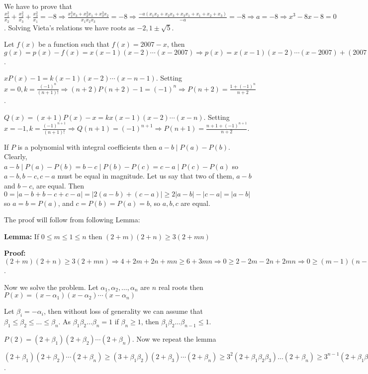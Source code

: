   We have to prove that $\frac{x_1^2}{x_2} + \frac{x_2^2}{x_3} + \frac{x_3^2}{x_1} = -8 \Rightarrow
  \frac{x_1^3x_3 + x_2^3x_1 + x_3^3x_2}{x_1x_2x_3} = -8 \Rightarrow \frac{-a(x_1x_2 + x_2x_3 + x_3x_1 + x_1
    + x_2 + x_3)}{-a} = -8 \Rightarrow a = -8 \Rightarrow x^3 - 8x - 8 = 0$. Solving Vieta's relations we
  have roots as $-2, 1\pm\sqrt{5}$.
\item Let $f(x)$ be a function such that $f(x) = 2007 - x$, then $g(x) = p(x) - f(x) = x(x - 1)(x -
  2)\cdots(x - 2007)\Rightarrow p(x) = x(x - 1)(x - 2)\cdots(x - 2007) + (2007 - x)$.
\item $xP(x) - 1 = k(x - 1)(x - 2)\cdots (x - n - 1)$. Setting $x = 0, k = \frac{(-1)^n}{(n +
  1)!}\Rightarrow (n + 2)P(n + 2) - 1 = (-1)^n \Rightarrow P(n + 2) = \frac{1 + (-1)^n}{n + 2}$.
\item $Q(x) = (x + 1)P(x) - x = kx(x - 1)(x - 2)\cdots(x - n)$. Setting $x = -1, k = \frac{(-1)^{n + 1}}{(n
  + 1)!}\Rightarrow Q(n + 1) = (-1)^{n + 1}\Rightarrow P(n + 1) = \frac{n + 1 + (-1)^{n + 1}}{n + 2}$.
\item If $P$ is a polynomial with integral coefficients then $a - b\mid P(a) - P(b)$. Clearly, $a - b\mid
  P(a) - P(b) = b - c\mid P(b) - P(c) = c - a\mid P(c) - P(a)$ so $a - b, b - c, c - a$ must be equal in
  magnitude. Let us say that two of them, $a - b$ and $b - c$, are equal. Then $0 = |a - b + b - c + c - a|
  = |2(a - b) + (c - a)|\geq 2|a - b| - |c - a| = |a - b|$ so $a = b = P(a)$, and $c = P(b) = P(a) = b$, so
  $a, b, c$ are equal.
\item The proof will follow from following Lemma:

  {\bf Lemma:} If $0\leq m\leq 1\leq n$ then $(2 + m)(2 + n)\geq 3(2 + mn)$

  {\bf Proof:} $(2 + m)(2 + n)\geq 3(2 + mn)\Rightarrow 4 + 2m + 2n + mn\geq 6 + 3mn\Rightarrow 0\geq 2 - 2m
  - 2n + 2mn\Rightarrow 0\geq (m - 1)(n - 1)$.

  Now we solve the problem. Let $\alpha_1, \alpha_2, \ldots, \alpha_n$ are $n$ real roots then $P(x) = (x -
  \alpha_1)(x - \alpha_2)\cdots(x - \alpha_n)$

  Let $\beta_i = -\alpha_i$, then without loss of generality we can assume that $\beta_1\leq\beta_2 \leq
  \ldots \leq \beta_n$. As $\beta_1\beta_2\ldots\beta_n = 1$ if $\beta_n\geq 1$, then $\beta_1\beta_2 \ldots
  \beta_{n - 1} \leq 1$.

  $P(2) = (2 + \beta_1)(2 + \beta_2) \cdots (2 + \beta_n)$. Now we repeat the lemma

  $(2 + \beta_1)(2 + \beta_2) \cdots (2 + \beta_n)\geq (3 + \beta_1\beta_2)(2 + \beta_3) \cdots (2 +
  \beta_n) \geq 3^2(2 + \beta_1\beta_2\beta_3) \ldots (2 + \beta_n)\geq 3^{n - 1}(2 + \beta_1\beta_2 \ldots
  \beta_{b})\geq 3^n$.

